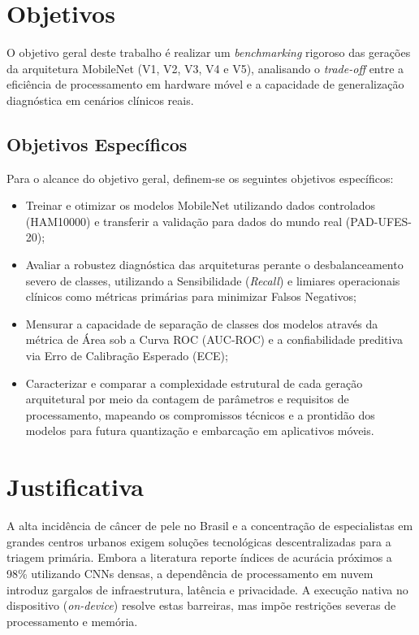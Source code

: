 \documentclass[oneside,english,brazilian]{UNISINOSmonografia}
\begin{document}
\section{Objetivos}

O objetivo geral deste trabalho é realizar um \textit{benchmarking} rigoroso das gerações da arquitetura MobileNet (V1, V2, V3, V4 e V5), analisando o \textit{trade-off} entre a eficiência de processamento em hardware móvel e a capacidade de generalização diagnóstica em cenários clínicos reais.

\subsection{Objetivos Específicos}
Para o alcance do objetivo geral, definem-se os seguintes objetivos específicos:

\begin{itemize}
    \item Treinar e otimizar os modelos MobileNet utilizando dados controlados (HAM10000) e transferir a validação para dados do mundo real (PAD-UFES-20);
    \item Avaliar a robustez diagnóstica das arquiteturas perante o desbalanceamento severo de classes, utilizando a Sensibilidade (\textit{Recall}) e limiares operacionais clínicos como métricas primárias para minimizar Falsos Negativos;
    \item Mensurar a capacidade de separação de classes dos modelos através da métrica de Área sob a Curva ROC (AUC-ROC) e a confiabilidade preditiva via Erro de Calibração Esperado (ECE);
    \item Caracterizar e comparar a complexidade estrutural de cada geração arquitetural por meio da contagem de parâmetros e requisitos de processamento, mapeando os compromissos técnicos e a prontidão dos modelos para futura quantização e embarcação em aplicativos móveis.
\end{itemize}

\section{Justificativa}
A alta incidência de câncer de pele no Brasil e a concentração de especialistas em grandes centros urbanos exigem soluções tecnológicas descentralizadas para a triagem primária. Embora a literatura reporte índices de acurácia próximos a 98\% utilizando CNNs densas, a dependência de processamento em nuvem introduz gargalos de infraestrutura, latência e privacidade. A execução nativa no dispositivo (\textit{on-device}) resolve estas barreiras, mas impõe restrições severas de processamento e memória. 
\end{document}
